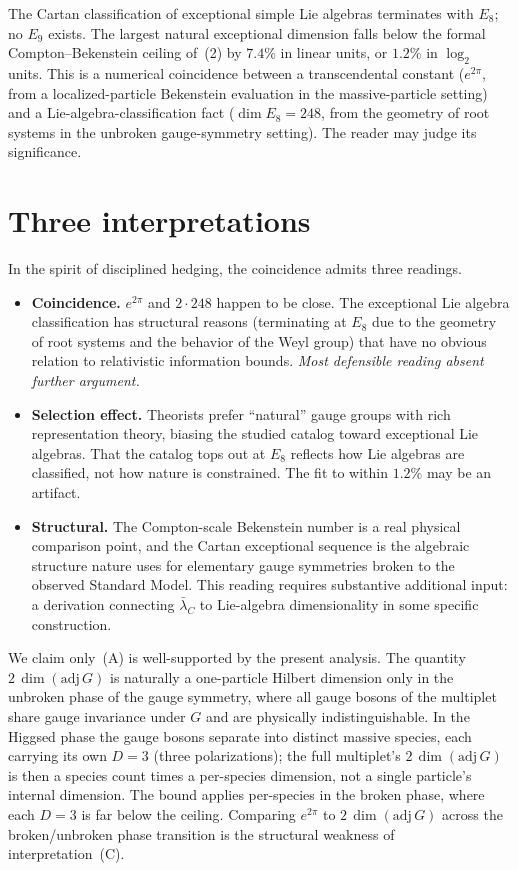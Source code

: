 \documentclass[11pt]{article}
\newcommand{\lbar}{\bar\lambda_{C}}
\begin{document}
The Cartan classification of exceptional simple Lie algebras terminates with $E_{8}$; no $E_{9}$
exists. The largest natural exceptional dimension falls below the formal Compton--Bekenstein ceiling
of~(2) by $7.4\%$ in linear units, or $1.2\%$ in $\log_{2}$ units. This is a numerical coincidence
between a transcendental constant ($e^{2\pi}$, from a localized-particle Bekenstein evaluation in the
massive-particle setting) and a Lie-algebra-classification fact ($\dim E_{8} = 248$, from the geometry
of root systems in the unbroken gauge-symmetry setting). The reader may judge its significance.

\section{Three interpretations}

In the spirit of disciplined hedging, the coincidence admits three readings.
\begin{itemize}
\item[\textbf{(A)}] \textbf{Coincidence.} $e^{2\pi}$ and $2\cdot 248$ happen to be close. The
exceptional Lie algebra classification has structural reasons (terminating at $E_{8}$ due to the
geometry of root systems and the behavior of the Weyl group) that have no obvious relation to
relativistic information bounds. \emph{Most defensible reading absent further argument.}
\item[\textbf{(B)}] \textbf{Selection effect.} Theorists prefer ``natural'' gauge groups with rich
representation theory, biasing the studied catalog toward exceptional Lie algebras. That the catalog
tops out at $E_{8}$ reflects how Lie algebras are classified, not how nature is constrained. The fit
to within $1.2\%$ may be an artifact.
\item[\textbf{(C)}] \textbf{Structural.} The Compton-scale Bekenstein number is a real physical
comparison point, and the Cartan exceptional sequence is the algebraic structure nature uses for
elementary gauge symmetries broken to the observed Standard Model. This reading requires substantive
additional input: a derivation connecting $\lbar$ to Lie-algebra dimensionality in some specific
construction.
\end{itemize}

We claim only~(A) is well-supported by the present analysis. The quantity $2\,\dim(\mathrm{adj}\,G)$
is naturally a one-particle Hilbert dimension only in the unbroken phase of the gauge symmetry, where
all gauge bosons of the multiplet share gauge invariance under $G$ and are physically
indistinguishable. In the Higgsed phase the gauge bosons separate into distinct massive species, each
carrying its own $D = 3$ (three polarizations); the full multiplet's $2\,\dim(\mathrm{adj}\,G)$ is
then a species count times a per-species dimension, not a single particle's internal dimension. The bound applies per-species in the broken phase, where each $D = 3$ is far below the ceiling.
Comparing $e^{2\pi}$ to $2\,\dim(\mathrm{adj}\,G)$ across the broken/unbroken phase transition is the
structural weakness of interpretation~(C).
\end{document}

